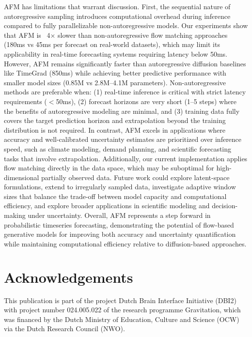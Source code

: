 \documentclass[a4paper,10pt,twocolumn,preprint,3p]{elsarticle}
\begin{document}
AFM has limitations that warrant discussion. First, the sequential nature of autoregressive sampling introduces computational overhead during inference compared to fully parallelizable non-autoregressive models. Our experiments show that AFM is ~4× slower than non-autoregressive flow matching approaches (180ms vs 45ms per forecast on real-world datasets), which may limit its applicability in real-time forecasting systems requiring latency below 50ms. However, AFM remains significantly faster than autoregressive diffusion baselines like TimeGrad (850ms) while achieving better predictive performance with smaller model sizes (0.85M vs 2.8M--4.1M parameters).
Non-autoregressive methods are preferable when: (1) real-time inference is critical with strict latency requirements ($<$50ms), (2) forecast horizons are very short (1--5 steps) where the benefits of autoregressive modeling are minimal, and (3) training data fully covers the target prediction horizon and extrapolation beyond the training distribution is not required. In contrast, AFM excels in applications where accuracy and well-calibrated uncertainty estimates are prioritized over inference speed, such as climate modeling, demand planning, and scientific forecasting tasks that involve extrapolation. 
Additionally, our current implementation applies flow matching directly in the data space, which may be suboptimal for high-dimensional partially observed data. Future work could explore latent-space formulations, extend to irregularly sampled data, investigate adaptive window sizes that balance the trade-off between model capacity and computational efficiency, and explore broader applications in scientific modeling and decision-making under uncertainty. Overall, AFM represents a step forward in probabilistic timeseries forecasting, demonstrating the potential of flow-based generative models for improving both accuracy and uncertainty quantification while maintaining computational efficiency relative to diffusion-based approaches.

\section*{Acknowledgements}

This publication is part of the project Dutch Brain Interface Initiative (DBI2) with project number 024.005.022 of the research programme Gravitation, which was financed by the Dutch Ministry of Education, Culture and Science (OCW) via the Dutch Research Council (NWO).



\end{document}
